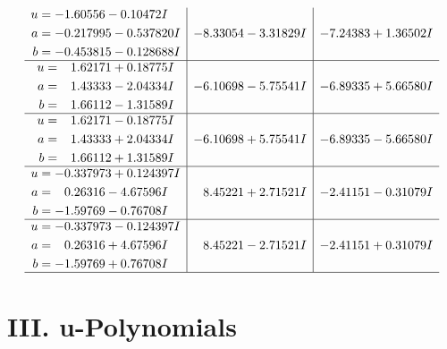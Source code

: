 \documentclass[1p]{elsarticle_modified}
\theoremstyle{definition}
\begin{document}
$$\begin{array}{c|c|c}
\begin{aligned}
u &= -1.60556 - 0.10472 I \\
a &= -0.217995 - 0.537820 I \\
b &= -0.453815 - 0.128688 I\end{aligned}
 & -8.33054 - 3.31829 I & -7.24383 + 1.36502 I \\ \hline\begin{aligned}
u &= \phantom{-}1.62171 + 0.18775 I \\
a &= \phantom{-}1.43333 - 2.04334 I \\
b &= \phantom{-}1.66112 - 1.31589 I\end{aligned}
 & -6.10698 - 5.75541 I & -6.89335 + 5.66580 I \\ \hline\begin{aligned}
u &= \phantom{-}1.62171 - 0.18775 I \\
a &= \phantom{-}1.43333 + 2.04334 I \\
b &= \phantom{-}1.66112 + 1.31589 I\end{aligned}
 & -6.10698 + 5.75541 I & -6.89335 - 5.66580 I \\ \hline\begin{aligned}
u &= -0.337973 + 0.124397 I \\
a &= \phantom{-}0.26316 - 4.67596 I \\
b &= -1.59769 - 0.76708 I\end{aligned}
 & \phantom{-}8.45221 + 2.71521 I & -2.41151 - 0.31079 I \\ \hline\begin{aligned}
u &= -0.337973 - 0.124397 I \\
a &= \phantom{-}0.26316 + 4.67596 I \\
b &= -1.59769 + 0.76708 I\end{aligned}
 & \phantom{-}8.45221 - 2.71521 I & -2.41151 + 0.31079 I\\
 \hline 
 \end{array}$$\newpage
\newpage\renewcommand{\arraystretch}{1}
\centering \section*{ III. u-Polynomials}
\end{document}
